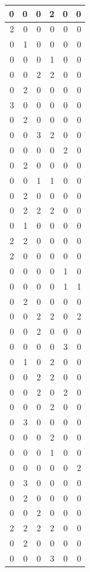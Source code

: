 \documentclass[
  12pt,
]{krantz}
\begin{document}
\begin{tabular}{r|r|r|r|r|r}
\hline
0 & 0 & 0 & 2 & 0 & 0\\
\hline
2 & 0 & 0 & 0 & 0 & 0\\
\hline
0 & 1 & 0 & 0 & 0 & 0\\
\hline
0 & 0 & 0 & 1 & 0 & 0\\
\hline
0 & 0 & 2 & 2 & 0 & 0\\
\hline
0 & 2 & 0 & 0 & 0 & 0\\
\hline
3 & 0 & 0 & 0 & 0 & 0\\
\hline
0 & 2 & 0 & 0 & 0 & 0\\
\hline
0 & 0 & 3 & 2 & 0 & 0\\
\hline
0 & 0 & 0 & 0 & 2 & 0\\
\hline
0 & 2 & 0 & 0 & 0 & 0\\
\hline
0 & 0 & 1 & 1 & 0 & 0\\
\hline
0 & 2 & 0 & 0 & 0 & 0\\
\hline
0 & 2 & 2 & 2 & 0 & 0\\
\hline
0 & 1 & 0 & 0 & 0 & 0\\
\hline
2 & 2 & 0 & 0 & 0 & 0\\
\hline
2 & 0 & 0 & 0 & 0 & 0\\
\hline
0 & 0 & 0 & 0 & 1 & 0\\
\hline
0 & 0 & 0 & 0 & 1 & 1\\
\hline
0 & 2 & 0 & 0 & 0 & 0\\
\hline
0 & 0 & 2 & 2 & 0 & 2\\
\hline
0 & 0 & 2 & 0 & 0 & 0\\
\hline
0 & 0 & 0 & 0 & 3 & 0\\
\hline
0 & 1 & 0 & 2 & 0 & 0\\
\hline
0 & 0 & 2 & 2 & 0 & 0\\
\hline
0 & 0 & 2 & 0 & 2 & 0\\
\hline
0 & 0 & 0 & 2 & 0 & 0\\
\hline
0 & 3 & 0 & 0 & 0 & 0\\
\hline
0 & 0 & 0 & 2 & 0 & 0\\
\hline
0 & 0 & 0 & 1 & 0 & 0\\
\hline
0 & 0 & 0 & 0 & 0 & 2\\
\hline
0 & 3 & 0 & 0 & 0 & 0\\
\hline
0 & 2 & 0 & 0 & 0 & 0\\
\hline
0 & 0 & 2 & 0 & 0 & 0\\
\hline
2 & 2 & 2 & 2 & 0 & 0\\
\hline
0 & 2 & 0 & 0 & 0 & 0\\
\hline
0 & 0 & 0 & 3 & 0 & 0\\

\end{tabular}
\end{document}
